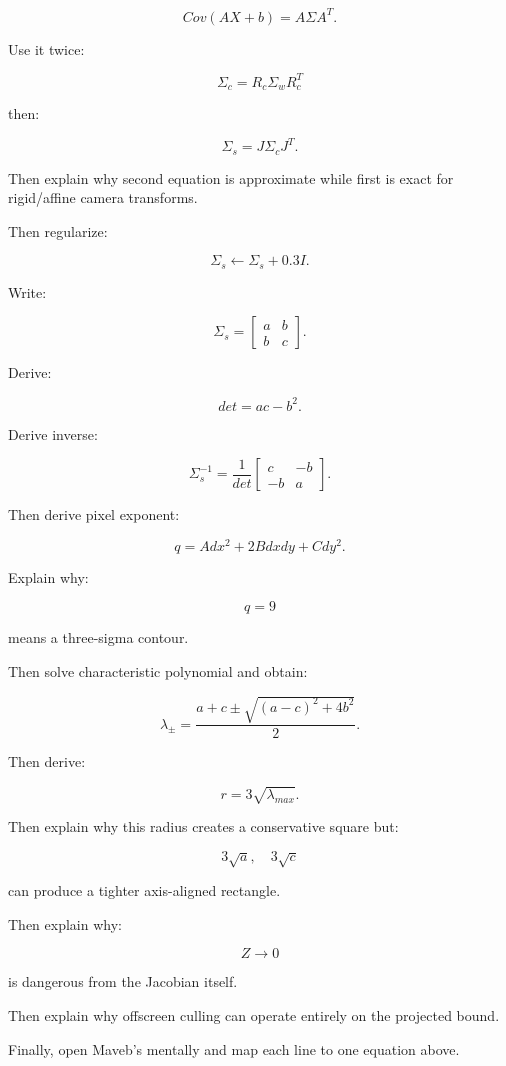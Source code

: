 \[
Cov(AX+b)=A\Sigma A^T.
\]

Use it twice:

\[
\Sigma_c=
R_c\Sigma_wR_c^T
\]

then:

\[
\Sigma_s=
J\Sigma_cJ^T.
\]

Then explain why second equation is approximate while first is exact for rigid/affine camera transforms.

Then regularize:

\[
\Sigma_s\leftarrow
\Sigma_s+0.3I.
\]

Write:

\[
\Sigma_s=
\begin{bmatrix}
a&b\\
b&c
\end{bmatrix}.
\]

Derive:

\[
det=
ac-b^2.
\]

Derive inverse:

\[
\Sigma_s^{-1}
=
\frac1{det}
\begin{bmatrix}
c&-b\\
-b&a
\end{bmatrix}.
\]

Then derive pixel exponent:

\[
q=
A dx^2+
2Bdxdy+
Cdy^2.
\]

Explain why:

\[
q=9
\]

means a three-sigma contour.

Then solve characteristic polynomial and obtain:

\[
\lambda_{\pm}
=
\frac{
a+c\pm
\sqrt{(a-c)^2+4b^2}
}{2}.
\]

Then derive:

\[
r=3\sqrt{\lambda_{max}}.
\]

Then explain why this radius creates a conservative square but:

\[
3\sqrt a,\quad3\sqrt c
\]

can produce a tighter axis-aligned rectangle.

Then explain why:

\[
Z\rightarrow0
\]

is dangerous from the Jacobian itself.

Then explain why offscreen culling can operate entirely on the projected bound.

Finally, open Maveb's  mentally and map each line to one equation above.

